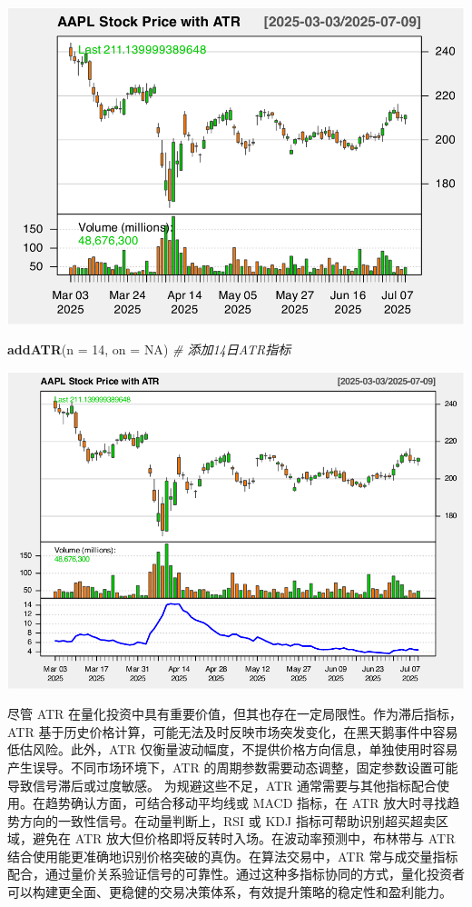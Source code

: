 \documentclass[]{ctexbook}
\newenvironment{Shaded}{\begin{snugshade}}{\end{snugshade}}
\newcommand{\AttributeTok}[1]{\textcolor[rgb]{0.13,0.29,0.53}{#1}}
\newcommand{\CommentTok}[1]{\textcolor[rgb]{0.56,0.35,0.01}{\textit{#1}}}
\newcommand{\ConstantTok}[1]{\textcolor[rgb]{0.56,0.35,0.01}{#1}}
\newcommand{\DecValTok}[1]{\textcolor[rgb]{0.00,0.00,0.81}{#1}}
\newcommand{\FunctionTok}[1]{\textcolor[rgb]{0.13,0.29,0.53}{\textbf{#1}}}
\newcommand{\NormalTok}[1]{#1}
\begin{document}
\includegraphics[width=0.9\linewidth]{quantmod_files/figure-latex/atr-1}

\begin{Shaded}
\begin{Highlighting}[]
\FunctionTok{addATR}\NormalTok{(}\AttributeTok{n =} \DecValTok{14}\NormalTok{, }\AttributeTok{on =} \ConstantTok{NA}\NormalTok{)  }\CommentTok{\# 添加14日ATR指标}
\end{Highlighting}
\end{Shaded}

\includegraphics[width=0.9\linewidth]{quantmod_files/figure-latex/atr-2}

尽管 ATR 在量化投资中具有重要价值，但其也存在一定局限性。作为滞后指标，ATR 基于历史价格计算，可能无法及时反映市场突发变化，在黑天鹅事件中容易低估风险。此外，ATR 仅衡量波动幅度，不提供价格方向信息，单独使用时容易产生误导。不同市场环境下，ATR 的周期参数需要动态调整，固定参数设置可能导致信号滞后或过度敏感。
为规避这些不足，ATR 通常需要与其他指标配合使用。在趋势确认方面，可结合移动平均线或 MACD 指标，在 ATR 放大时寻找趋势方向的一致性信号。在动量判断上，RSI 或 KDJ 指标可帮助识别超买超卖区域，避免在 ATR 放大但价格即将反转时入场。在波动率预测中，布林带与 ATR 结合使用能更准确地识别价格突破的真伪。在算法交易中，ATR 常与成交量指标配合，通过量价关系验证信号的可靠性。通过这种多指标协同的方式，量化投资者可以构建更全面、更稳健的交易决策体系，有效提升策略的稳定性和盈利能力。
\end{document}
